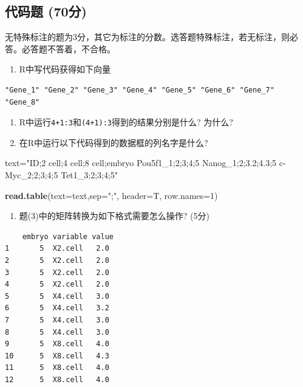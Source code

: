 \documentclass[]{article}
\newenvironment{Shaded}{\begin{snugshade}}{\end{snugshade}}
\newcommand{\KeywordTok}[1]{\textcolor[rgb]{0.13,0.29,0.53}{\textbf{{#1}}}}
\newcommand{\DataTypeTok}[1]{\textcolor[rgb]{0.13,0.29,0.53}{{#1}}}
\newcommand{\DecValTok}[1]{\textcolor[rgb]{0.00,0.00,0.81}{{#1}}}
\newcommand{\StringTok}[1]{\textcolor[rgb]{0.31,0.60,0.02}{{#1}}}
\newcommand{\NormalTok}[1]{{#1}}
\providecommand{\tightlist}{%
  \setlength{\itemsep}{0pt}\setlength{\parskip}{0pt}}
\numberwithin{figure}{section}
\numberwithin{table}{section}
\theoremstyle{definition}
\theoremstyle{definition}
\theoremstyle{definition}
\theoremstyle{remark}
\begin{document}
\subsection{代码题 (70分)}\label{-70}

无特殊标注的题为3分，其它为标注的分数。选答题特殊标注，若无标注，则必答。必答题不答着，不合格。

\begin{enumerate}
\def\labelenumi{\arabic{enumi}.}
\tightlist
\item
  R中写代码获得如下向量
\end{enumerate}

\begin{verbatim}
"Gene_1" "Gene_2" "Gene_3" "Gene_4" "Gene_5" "Gene_6" "Gene_7" "Gene_8"
\end{verbatim}

\begin{enumerate}
\def\labelenumi{\arabic{enumi}.}
\setcounter{enumi}{1}
\item
  R中运行\texttt{4+1:3}和\texttt{(4+1):3}得到的结果分别是什么? 为什么?
\item
  在R中运行以下代码得到的数据框的列名字是什么?
\end{enumerate}

\begin{Shaded}
\begin{Highlighting}[]
\NormalTok{text=}\StringTok{"ID;2 cell;4 cell;8 cell;embryo}
\StringTok{Pou5f1_1;2;3;4;5}
\StringTok{Nanog_1;2;3.2;4.3;5}
\StringTok{c-Myc_2;2;3;4;5}
\StringTok{Tet1_3;2;3;4;5"}

\KeywordTok{read.table}\NormalTok{(}\DataTypeTok{text=}\NormalTok{text,}\DataTypeTok{sep=}\StringTok{";"}\NormalTok{, }\DataTypeTok{header=}\NormalTok{T, }\DataTypeTok{row.names=}\DecValTok{1}\NormalTok{)}
\end{Highlighting}
\end{Shaded}

\begin{enumerate}
\def\labelenumi{\arabic{enumi}.}
\setcounter{enumi}{3}
\tightlist
\item
  题(3)中的矩阵转换为如下格式需要怎么操作? (5分)
\end{enumerate}

\begin{verbatim}
    embryo variable value
1       5  X2.cell   2.0
2       5  X2.cell   2.0
3       5  X2.cell   2.0
4       5  X2.cell   2.0
5       5  X4.cell   3.0
6       5  X4.cell   3.2
7       5  X4.cell   3.0
8       5  X4.cell   3.0
9       5  X8.cell   4.0
10      5  X8.cell   4.3
11      5  X8.cell   4.0
12      5  X8.cell   4.0
\end{verbatim}
\end{document}
